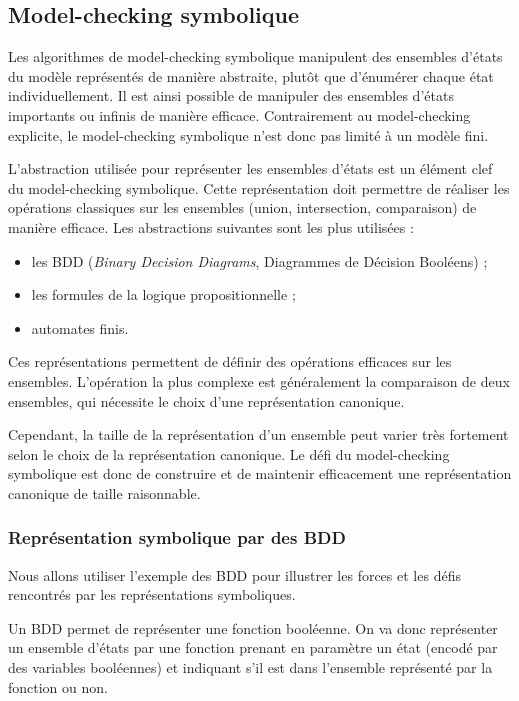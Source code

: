 \subsection{Model-checking symbolique}

Les algorithmes de model-checking symbolique manipulent des ensembles d'états
du modèle représentés de manière abstraite, plutôt que d'énumérer chaque état
individuellement. Il est ainsi possible de manipuler des ensembles
d'états importants ou infinis de manière efficace. Contrairement au
model-checking explicite, le model-checking symbolique n'est donc pas limité à
un modèle fini.

L'abstraction utilisée pour représenter les ensembles d'états est un élément
clef du model-checking symbolique. Cette représentation doit permettre de
réaliser les opérations classiques sur les ensembles (union, intersection,
comparaison) de manière efficace. Les abstractions suivantes sont les plus
utilisées :

\begin{itemize}
\item
  les BDD (\emph{Binary Decision Diagrams}, Diagrammes de Décision Booléens) ;
\item
  les formules de la logique propositionnelle ;
\item
  automates finis.
\end{itemize}

Ces représentations permettent de définir des opérations efficaces sur les
ensembles. L'opération la plus complexe est généralement la comparaison de deux
ensembles, qui nécessite le choix d'une représentation canonique.

Cependant, la taille de la représentation d'un ensemble peut varier très
fortement selon le choix de la représentation canonique. Le défi du
model-checking symbolique est donc de construire et de maintenir efficacement
une représentation canonique de taille raisonnable.

\subsubsection{Représentation symbolique par des BDD}

Nous allons utiliser l'exemple des BDD pour illustrer les forces et les
défis rencontrés par les représentations symboliques.

Un BDD permet de représenter une fonction booléenne.
On va donc représenter un ensemble d'états par une fonction prenant
en paramètre un état (encodé par des variables booléennes) et indiquant s’il est dans l'ensemble représenté par la fonction ou non.

